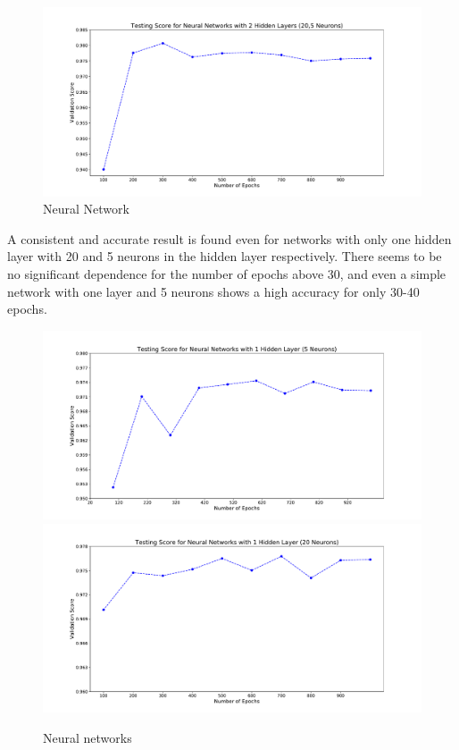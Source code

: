 \begin{figure}[h]
\includegraphics[width=\onepic\textwidth]{plots/epochsvsscore3_10seeds.pdf}
\caption{
Neural Network
}
\label{fig:Maps_data}
\end{figure}

A consistent and accurate result is found even for networks with only one hidden layer with 20 and 5 neurons in the hidden layer respectively. There seems to be no significant dependence for the number of epochs above 30, and even a simple network with one layer and 5 neurons shows a high accuracy for only 30-40 epochs.\\


\begin{figure}[h]
\includegraphics[width=\twopicsp\textwidth]{plots/epochsvsscore1_10seeds.pdf}
\includegraphics[width=\twopicsp\textwidth]{plots/epochsvsscore2_10seeds.pdf}
\caption{
Neural networks
}
\label{fig:Maps_data}
\end{figure}

